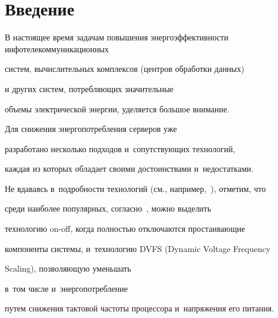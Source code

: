 



















      \thispagestyle{headings}

      






\section{Введение}



В настоящее время задачам повышения энергоэффективности инфотелекоммуникационных

систем, вычислительных комплексов (центров обработки данных)

и других систем, потребляющих значительные

объемы электрической энергии, уделяется большое внимание.

Для снижения энергопотребления серверов уже

разработано несколько подходов и~сопутствующих технологий,

каждая из которых обладает своими достоинствами и~недостатками.

Не вдаваясь в~подробности технологий (см., например,~\cite{a2}), отметим, что

среди наиболее популярных, согласно~\cite{a1}, можно выделить

технологию on-off, когда полностью отключаются простаивающие

компоненты системы, и~технологию DVFS (Dynamic Voltage Frequency

Scaling), позволяющую уменьшать 

в~том числе и~энергопотребление

путем снижения тактовой частоты процессора и~напряжения его питания.

